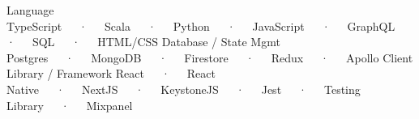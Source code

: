 

\begin{cvtechnicals}
  \cvtechnical %
  {Language} %
  {TypeScript~~~·~~~Scala~~~·~~~Python~~~·~~~JavaScript~~~·~~~GraphQL~~~·~~~SQL~~~·~~~HTML/CSS} %
  {Database / State Mgmt} %
  {Postgres~~~·~~~MongoDB~~~·~~~Firestore~~~·~~~Redux~~~·~~~Apollo Client} %
  {Library / Framework} %
  {React~~~·~~~React Native~~~·~~~NextJS~~~·~~~KeystoneJS~~~·~~~Jest~~~·~~~Testing Library~~~·~~~Mixpanel} %
\end{cvtechnicals}